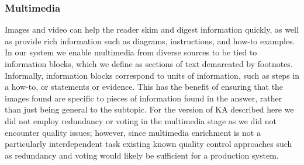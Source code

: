 
\subsubsection{Multimedia}

Images and video can help the reader skim and digest information quickly, as well as provide rich information such as diagrams, instructions, and how-to examples. In our system we enable multimedia from diverse sources to be tied to information blocks, which we define as sections of text demarcated by footnotes. Informally, information blocks correspond to units of information, such as steps in a how-to, or statements or evidence. This has the benefit of ensuring that the images found are specific to pieces of information found in the answer, rather than just being general to the subtopic. For the version of KA described here we did not employ redundancy or voting in the multimedia stage as we did not encounter quality issues; however, since multimedia enrichment is not a particularly interdependent task existing known quality control approaches such as redundancy and voting \cite{kittur2013future} would likely be sufficient for a production system.


